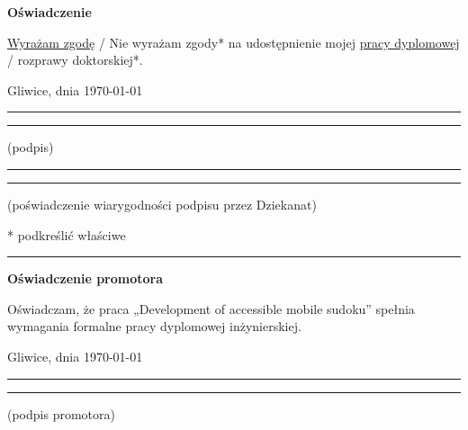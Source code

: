 \documentclass[a4paper,twoside,12pt]{book}
\newcommand{\Title}{Development of accessible mobile sudoku}
\begin{document}
\begin{center}
\Large\bfseries Oświadczenie
\end{center}

\vfill

\underline{Wyrażam  zgodę} / Nie wyrażam zgody*  na  udostępnienie  mojej  \underline{pracy  dyplomowej} / rozprawy doktorskiej*.

\vfill

Gliwice, dnia {\today}

\vfill

\rule{0.5\textwidth}{0cm}\dotfill 

\rule{0.5\textwidth}{0cm}
\begin{minipage}{0.45\textwidth}
{\begin{center}(podpis)\end{center}}
\end{minipage} 

\vfill

\rule{0.5\textwidth}{0cm}\dotfill 

\rule{0.5\textwidth}{0cm}
\begin{minipage}{0.45\textwidth}
{\begin{center}\rule{0mm}{5mm}(poświadczenie wiarygodności podpisu przez Dziekanat)\end{center}}
\end{minipage}


\vfill

* podkreślić właściwe

 


\cleardoublepage

\rule{1cm}{0cm}

\vfill  

\begin{center}
\Large\bfseries Oświadczenie promotora
\end{center}

\vfill

Oświadczam, że praca „\Title” spełnia wymagania formalne pracy dyplomowej inżynierskiej.

\vfill



\vfill

Gliwice, dnia {\today}

\rule{0.5\textwidth}{0cm}\dotfill 

\rule{0.5\textwidth}{0cm}
\begin{minipage}{0.45\textwidth}
{\begin{center}(podpis promotora)\end{center}}
\end{minipage} 
\end{document}
